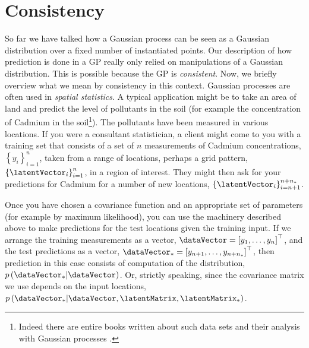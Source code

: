 



\section{Consistency}

So far we have talked how a Gaussian process can be seen as a Gaussian
distribution over a fixed number of instantiated points. Our
description of how prediction is done in a GP really only relied on
manipulations of a Gaussian distribution. This is possible because the
GP is \emph{consistent}. Now, we briefly overview what we mean by
consistency in this context. Gaussian processes are often used in
\emph{spatial statistics}. A typical application might be to take an
area of land and predict the level of pollutants in the soil (for
example the concentration of Cadmium in the soil\footnote{Indeed there
  are entire books written about such data sets and their analysis
  with Gaussian processes \cite{Goovaerts:book97}.}). The pollutants
have been measured in various locations. If you were a consultant
statistician, a client might come to you with a training set that
consists of a set of $n$ measurements of Cadmium concentrations,
$\left\{y_i\right\}_{i=1}^n$, taken from a range of locations, perhaps
a grid pattern, $\left\{\latentVector_i\right\}_{i=1}^n$, in a region of
interest. They might then ask for your predictions for Cadmium for a
number of new locations,
$\left\{\latentVector_i\right\}_{i=n+1}^{n+n_*}$.

Once you have chosen a covariance function and an appropriate set of
parameters (for example by maximum likelihood), you can use the
machinery described above to make predictions for the test locations
given the training input. If we arrange the training measurements as a
vector, $\dataVector = \left[y_1,\dots,y_n\right]^\top$, and the test
predictions as a vector, $\dataVector_* = \left[y_{n+1}, \dots,
  y_{n+n_*}\right]^\top$, then prediction in this case consists of
computation of the distribution,
$p\left(\dataVector_*|\dataVector\right)$. Or, strictly speaking, since
the covariance matrix we use depends on the input locations,
$p\left(\dataVector_*|\dataVector, \latentMatrix, \latentMatrix_*\right)$.

